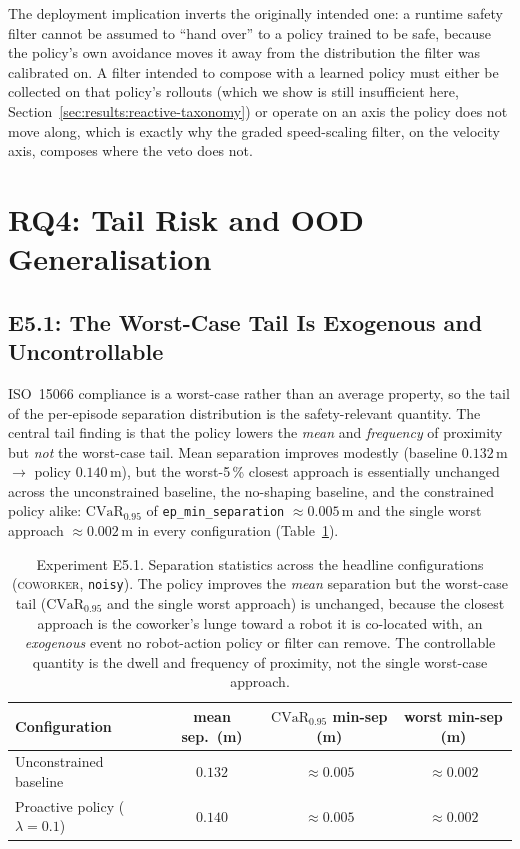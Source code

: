\documentclass[11pt,a4paper]{report}
\newcommand{\iso}{ISO~15066}
\newcommand{\cvar}{\ensuremath{\mathrm{CVaR}}}
\newcommand{\coworker}{\textsc{coworker}}
\begin{document}
The deployment implication inverts the originally intended one: a
runtime safety filter cannot be assumed to ``hand over'' to a policy
trained to be safe, because the policy's own avoidance moves it away
from the distribution the filter was calibrated on. A filter intended
to compose with a learned policy must either be collected on that
policy's rollouts (which we show is still insufficient here,
Section~\ref{sec:results:reactive-taxonomy}) or operate on an axis the
policy does not move along, which is exactly why the graded
speed-scaling filter, on the velocity axis, composes where the veto
does not.

\section{RQ4: Tail Risk and OOD Generalisation}
\label{sec:results:rq4}

\subsection{E5.1: The Worst-Case Tail Is Exogenous and Uncontrollable}
\label{sec:results:tail}
\label{sec:exogenous}

\iso{} compliance is a worst-case rather than an average property, so
the tail of the per-episode separation distribution is the
safety-relevant quantity. The central tail finding is that the policy
lowers the \emph{mean} and \emph{frequency} of proximity but
\emph{not} the worst-case tail. Mean separation improves modestly
(baseline $0.132$\,m $\rightarrow$ policy $0.140$\,m), but the
worst-5\,\% closest approach is essentially unchanged across the
unconstrained baseline, the no-shaping baseline, and the constrained
policy alike: $\cvar_{0.95}$ of \texttt{ep\_min\_separation}
$\approx 0.005$\,m and the single worst approach
$\approx 0.002$\,m in every configuration
(Table~\ref{tab:e5.1-tail}).

\begin{table}[h]
\centering
\caption{Experiment E5.1. Separation statistics across the headline
configurations (\coworker{}, \texttt{noisy}). The policy improves the
\emph{mean} separation but the worst-case tail ($\cvar_{0.95}$ and the
single worst approach) is unchanged, because the closest approach is
the coworker's lunge toward a robot it is co-located with, an
\emph{exogenous} event no robot-action policy or filter can remove.
The controllable quantity is the dwell and frequency of proximity, not
the single worst-case approach.}
\label{tab:e5.1-tail}
\small
\begin{tabular}{lccc}
\toprule
Configuration & mean sep.\ (m) & $\cvar_{0.95}$ min-sep (m) & worst min-sep (m) \\
\midrule
Unconstrained baseline             & $0.132$ & $\approx 0.005$ & $\approx 0.002$ \\
Proactive policy ($\lambda{=}0.1$) & $0.140$ & $\approx 0.005$ & $\approx 0.002$ \\
\bottomrule
\end{tabular}
\end{table}
\end{document}
